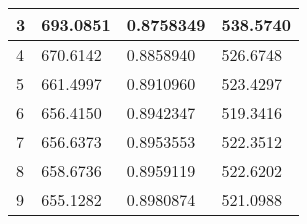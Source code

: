 \documentclass{article}\usepackage[]{graphicx}\usepackage[]{color}
\begin{document}
\begin{table}[h]
\begin{tabular}{|llll|}
\multicolumn{1}{|l|}{3}                                                                                                                                                                                                                    & \multicolumn{1}{l|}{693.0851}      & \multicolumn{1}{l|}{0.8758349}         & 538.5740     \\ \hline
\multicolumn{1}{|l|}{4}                                                                                                                                                                                                                    & \multicolumn{1}{l|}{670.6142}      & \multicolumn{1}{l|}{0.8858940}         & 526.6748     \\ \hline
\multicolumn{1}{|l|}{5}                                                                                                                                                                                                                    & \multicolumn{1}{l|}{661.4997}      & \multicolumn{1}{l|}{0.8910960}         & 523.4297     \\ \hline
\multicolumn{1}{|l|}{6}                                                                                                                                                                                                                    & \multicolumn{1}{l|}{656.4150}      & \multicolumn{1}{l|}{0.8942347}         & 519.3416     \\ \hline
\multicolumn{1}{|l|}{7}                                                                                                                                                                                                                    & \multicolumn{1}{l|}{656.6373}      & \multicolumn{1}{l|}{0.8953553}         & 522.3512     \\ \hline
\multicolumn{1}{|l|}{8}                                                                                                                                                                                                                    & \multicolumn{1}{l|}{658.6736}      & \multicolumn{1}{l|}{0.8959119}         & 522.6202     \\ \hline
\multicolumn{1}{|l|}{9}                                                                                                                                                                                                                    & \multicolumn{1}{l|}{655.1282}      & \multicolumn{1}{l|}{0.8980874}         & 521.0988     \\ \hline

\end{tabular}
\end{table}
\end{document}
